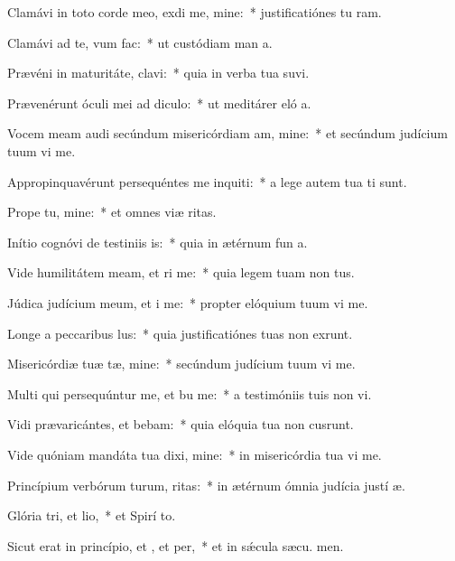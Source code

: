 \item Clamávi in toto corde meo, exdi me, mine:~* justificatiónes tu ram.
\item Clamávi ad te, vum  fac:~* ut custódiam man a.
\item Prævéni in maturitáte,  clavi:~* quia in verba tua suvi.
\item Prævenérunt óculi mei ad  diculo:~* ut meditárer eló a.
\item Vocem meam audi secúndum misericórdiam am, mine:~* et secúndum judícium tuum vi me.
\item Appropinquavérunt persequéntes me inquiti:~* a lege autem tua  ti sunt.
\item Prope  tu, mine:~* et omnes viæ  ritas.
\item Inítio cognóvi de testiniis is:~* quia in ætérnum fun a.
\item Vide humilitátem meam, et ri me:~* quia legem tuam non  tus.
\item Júdica judícium meum, et i me:~* propter elóquium tuum vi me.
\item Longe a peccaribus lus:~* quia justificatiónes tuas non exrunt.
\item Misericórdiæ tuæ tæ, mine:~* secúndum judícium tuum vi me.
\item Multi qui persequúntur me, et bu me:~* a testimóniis tuis non vi.
\item Vidi prævaricántes, et bebam:~* quia elóquia tua non cusrunt.
\item Vide quóniam mandáta tua dixi, mine:~* in misericórdia tua vi me.
\item Princípium verbórum turum, ritas:~* in ætérnum ómnia judícia justí æ.
\item Glória tri, et lio,~* et Spirí to.
\item Sicut erat in princípio, et , et per,~* et in sǽcula sæcu. men.
